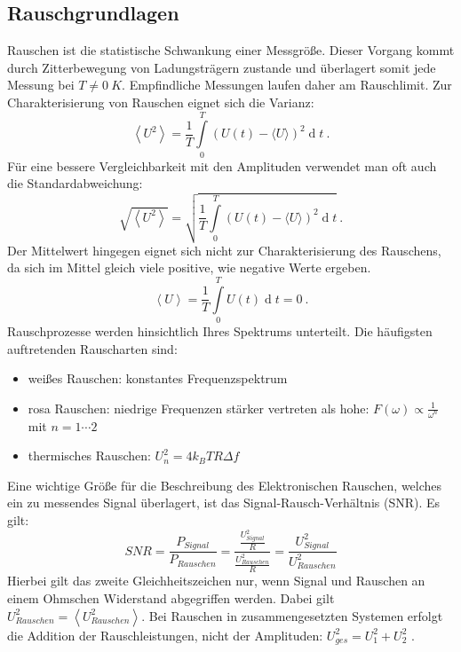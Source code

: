\documentclass{article}						%
\begin{document}
				\subsection{Rauschgrundlagen}
			Rauschen ist die statistische Schwankung einer Messgröße. Dieser Vorgang kommt durch Zitterbewegung von Ladungsträgern zustande und überlagert somit jede Messung bei $T \neq 0 \ K$. Empfindliche Messungen laufen daher am Rauschlimit.
			Zur Charakterisierung von Rauschen eignet sich die Varianz:
			\begin{equation}
				\left\langle U^{2} \right\rangle = \frac{1}{T} \int\limits_{0}^{T} \left(U(t)- \langle U \rangle \right)^{2} \operatorname{d}t \ .
			\end{equation}
			Für eine bessere Vergleichbarkeit mit den Amplituden verwendet man oft auch die Standardabweichung:
			\begin{equation}
				\sqrt{\left\langle U^{2} \right\rangle} = \sqrt{\frac{1}{T} \int\limits_{0}^{T} \left(U(t)- \langle U \rangle \right)^{2} \operatorname{d}t} \ .
			\end{equation}
			Der Mittelwert hingegen eignet sich nicht zur Charakterisierung des Rauschens, da sich im Mittel gleich viele positive, wie negative Werte ergeben.
			\begin{equation}
				\left\langle U \right\rangle = \frac{1}{T} \int\limits_{0}^{T} U(t) \operatorname{d}t =0 \ .
			\end{equation}
		\newline
		Rauschprozesse werden hinsichtlich Ihres Spektrums unterteilt. Die häufigsten auftretenden Rauscharten sind:
		\begin{itemize}
			\item weißes Rauschen: konstantes Frequenzspektrum
			\item rosa Rauschen: niedrige Frequenzen stärker vertreten als hohe: $F(\omega) \propto \frac{1}{\omega ^{n}}$ mit $n=1\cdots 2$
			\item thermisches Rauschen: $U_n ^2=4k_{B}TR\Delta f$
		\end{itemize}
		Eine wichtige Größe für die Beschreibung des Elektronischen Rauschen, welches ein zu messendes Signal überlagert, ist das Signal-Rausch-Verhältnis (SNR). Es gilt:
		\begin{equation}
			SNR=\frac{P_{Signal}}{P_{Rauschen}}=\frac{\frac{U_{Signal}^2}{R}}{\frac{U_{Rauschen}^2}{R}}=\frac{U_{Signal}^2}{U_{Rauschen}^2}
		\end{equation}
		Hierbei gilt das zweite Gleichheitszeichen nur, wenn  Signal und Rauschen an einem Ohmschen Widerstand abgegriffen werden. Dabei gilt $U_{Rauschen}^2=\left\langle U_{Rauschen}^{2} \right\rangle$. Bei Rauschen in zusammengesetzten Systemen erfolgt die Addition der Rauschleistungen, nicht der Amplituden: $U_{ges}^2=U_1^2+U_2^2$ .
\end{document}
